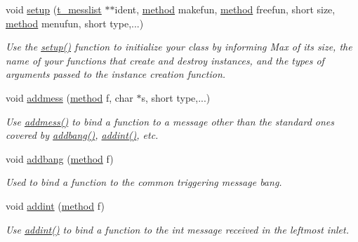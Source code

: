 \begin{DoxyCompactItemize}
\item 
void \hyperlink{group__class__old_ga24bbc5a9e8f7bb0a1c6847326e2f0a20}{setup} (\hyperlink{structt__messlist}{t\_\-messlist} $\ast$$\ast$ident, \hyperlink{group__datatypes_gac26ba0a173b50597f5738132e059b42d}{method} makefun, \hyperlink{group__datatypes_gac26ba0a173b50597f5738132e059b42d}{method} freefun, short size, \hyperlink{group__datatypes_gac26ba0a173b50597f5738132e059b42d}{method} menufun, short type,...)
\begin{DoxyCompactList}\small\item\em Use the \hyperlink{group__class__old_ga24bbc5a9e8f7bb0a1c6847326e2f0a20}{setup()} function to initialize your class by informing Max of its size, the name of your functions that create and destroy instances, and the types of arguments passed to the instance creation function. \item\end{DoxyCompactList}\item 
void \hyperlink{group__class__old_ga0d9bfa416fdd861d1b2fd2d17701cbb3}{addmess} (\hyperlink{group__datatypes_gac26ba0a173b50597f5738132e059b42d}{method} f, char $\ast$s, short type,...)
\begin{DoxyCompactList}\small\item\em Use \hyperlink{group__class__old_ga0d9bfa416fdd861d1b2fd2d17701cbb3}{addmess()} to bind a function to a message other than the standard ones covered by \hyperlink{group__class__old_gac667faa21ecad5184005266844ed0b48}{addbang()}, \hyperlink{group__class__old_ga85afc0cd451465117ac80593d3deb4f9}{addint()}, etc. \item\end{DoxyCompactList}\item 
void \hyperlink{group__class__old_gac667faa21ecad5184005266844ed0b48}{addbang} (\hyperlink{group__datatypes_gac26ba0a173b50597f5738132e059b42d}{method} f)
\begin{DoxyCompactList}\small\item\em Used to bind a function to the common triggering message bang. \item\end{DoxyCompactList}\item 
void \hyperlink{group__class__old_ga85afc0cd451465117ac80593d3deb4f9}{addint} (\hyperlink{group__datatypes_gac26ba0a173b50597f5738132e059b42d}{method} f)
\begin{DoxyCompactList}\small\item\em Use \hyperlink{group__class__old_ga85afc0cd451465117ac80593d3deb4f9}{addint()} to bind a function to the int message received in the leftmost inlet. \item\end{DoxyCompactList}\item 
$$
\end{DoxyCompactItemize}

